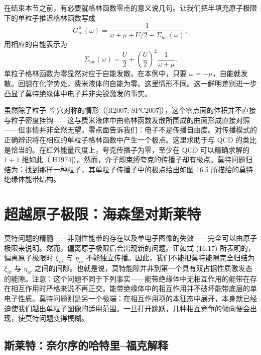 在结束本节之前，有必要就格林函数零点的意义说几句。让我们把半填充原子极限下的单粒子推迟格林函数写成
\begin{equation*}
G^{\mathrm{R}}_{i\sigma}(\omega)=\frac{1}{\omega+\mu+U/2-\Sigma_{\mathrm{loc}}(\omega)},\tag{16.57}
\end{equation*}
用相应的自能表示为
\begin{equation*}
\Sigma_{\mathrm{loc}}(\omega)=\frac{U}{2}+\left(\frac{U}{2}\right)^{2}\frac{1}{\omega+\mu}.\tag{16.58}
\end{equation*}
单粒子格林函数为零显然对应于自能发散。在本例中，只要 $\omega=-\mu$，自能就发散。回想在化学势处，费米液体的自能为零。这里情形不同。这一鲜明差别进一步凸显了莫特绝缘体中电子并非尖锐激发的事实。

虽然除了粒子--空穴对称的情形（[R2007; SPC2007]），这个零点面的体积并不直接与粒子密度挂钩——这与费米液体中由格林函数发散所围成的曲面形成直接对照——但事情并非全然无望。零点面告诉我们：电子不是传播自由度。对传播模式的正确辨识将在相应的单粒子格林函数中产生一个极点。这里求助于与 QCD 的类比是恰当的。在红外能量尺度上，夸克传播子为零，至少在 QCD 可以精确求解的 $1+1$ 维如此（[H1974]）。然而，介子即束缚夸克的传播子却有极点。莫特问题归结为：找到那样一种粒子，其单粒子传播子中的极点给出如图 16.5 所描绘的莫特绝缘体能带结构。

\section{超越原子极限：海森堡对斯莱特}

莫特问题的精髓——非刚性能带的存在以及单电子图像的失效——完全可以由原子极限来说明。然而，偏离原子极限后会出现新的问题。正如式 (16.17) 所表明的，偏离原子极限时 $\xi_{i\sigma}$ 与 $\eta_{i\sigma}$ 不能独立传播。因此，我们不能把莫特能隙完全归结为 $\xi_{i\sigma}$ 与 $\eta_{i\sigma}$ 之间的间隙。也就是说，莫特能隙并非到第一个具有双占据性质激发态的能隙。注意：这个问题不同于下列事实——能带绝缘体中无相互作用的能带在存在相互作用时严格来说不再正交。能带绝缘体中的相互作用并不破坏能带底层的单电子性质。莫特问题则是另一个极端：在相互作用项的本征态中展开，本身就已经迫使我们越出单粒子图像的适用范围。一旦打开跳跃，几种相互竞争的倾向便会出现，使莫特问题变得模糊。

\subsection{斯莱特：奈尔序的哈特里--福克解释}

